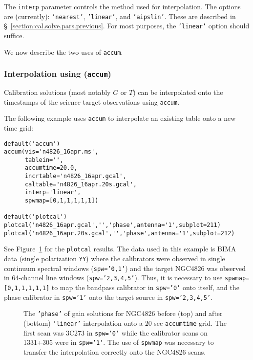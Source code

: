 The {\tt interp} parameter controls the method used for interpolation.
The options are (currently): {\tt 'nearest'}, {\tt 'linear'}, and
{\tt 'aipslin'}.
These are described in \S~\ref{section:cal.solve.pars.previous}.
For most purposes, the {\tt 'linear'} option should suffice.

We now describe the two uses of {\tt accum}.

\subsubsection{Interpolation using ({\tt accum})}
\label{section:cal.tables.accum.interp}

Calibration solutions (most notably $G$ or $T$) can be interpolated
onto the timestamps of the science target observations using {\tt accum}.  

The following example uses {\tt accum} to interpolate an existing
table onto a new time grid:
\small
\begin{verbatim}
default('accum')
accum(vis='n4826_16apr.ms',
      tablein='',
      accumtime=20.0,
      incrtable='n4826_16apr.gcal',
      caltable='n4826_16apr.20s.gcal',
      interp='linear',
      spwmap=[0,1,1,1,1,1])

default('plotcal')
plotcal('n4826_16apr.gcal','','phase',antenna='1',subplot=211)
plotcal('n4826_16apr.20s.gcal','','phase',antenna='1',subplot=212)
\end{verbatim}
\normalsize
See Figure~\ref{fig:accum_interp} for the {\tt plotcal} results.
The data used in this example is BIMA data (single polarization 
{\tt  YY}) where the calibrators were observed in single continuum
spectral windows ({\tt spw='0,1'}) and the target NGC4826 was observed
in 64-channel line windows ({\tt spw='2,3,4,5'}).  Thus, it is 
necessary to use {\tt spwmap=[0,1,1,1,1,1]} to map the bandpass
calibrator in {\tt spw='0'} onto itself, and the phase calibrator 
in {\tt spw='1'} onto the target source in {\tt spw='2,3,4,5'}.

\begin{figure}[h!]
\begin{center}
\caption{\label{fig:accum_interp} The {\tt 'phase'} of gain solutions
for NGC4826 before (top) and after (bottom) {\tt 'linear'} interpolation onto
a 20 sec {\tt accumtime} grid.  The first scan was 3C273 in {\tt spw='0'} 
while the calibrator scans on 1331+305 were in {\tt spw='1'}.  The use of 
{\tt spwmap} was necessary to transfer the interpolation correctly
onto the NGC4826 scans.
}
\hrulefill
\end{center}
\end{figure}


